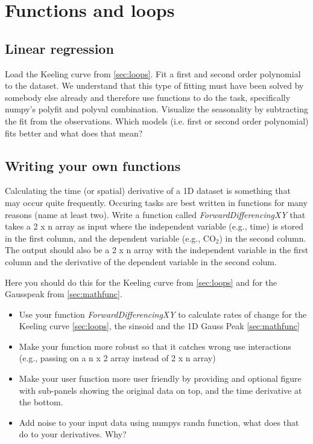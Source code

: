 
\section{Functions and loops}

\subsection{Linear regression}
Load the Keeling curve from \ref{sec:loops}. Fit a first and second order polynomial to the dataset. We understand that this type of fitting must have been solved by somebody else already and therefore use functions to do the task, specifically numpy's polyfit and polyval combination. Visualize the seasonality by subtracting the fit from the observations. Which models (i.e. first or second order polynomial) fits better and what does that mean?


\subsection{Writing your own functions}
Calculating the time (or spatial) derivative of a 1D dataset is something that may occur quite frequently. Occuring tasks are best written in functions for many reasons (name at least two). Write a function called \textit{ForwardDifferencingXY} that takes a 2 x n array as input where the independent variable (e.g., time) is stored in the first column, and the dependent variable (e.g., CO$_2$) in the second column. The output should also be a 2 x n array with the independent variable in the first column and the derivative of the dependent variable in the second colum. 


Here you should do this for the Keeling curve from \ref{sec:loops} and for the Gausspeak from \ref{sec:mathfunc}.
\begin{itemize}
    \item Use your function \textit{ForwardDifferencingXY} to calculate rates of change for the Keeling curve \ref{sec:loops}, the sinsoid and the 1D Gauss Peak \ref{sec:mathfunc}
    \item Make your function more robust so that it catches wrong use interactions (e.g., passing on a n x 2 array instead of 2 x n array)
    \item Make your user function more user friendly by providing and optional figure with sub-panels showing the original data on top, and the time derivative at the bottom. 
    \item Add noise to your input data using numpys randn function, what does that do to your derivatives. Why?
\end{itemize}
